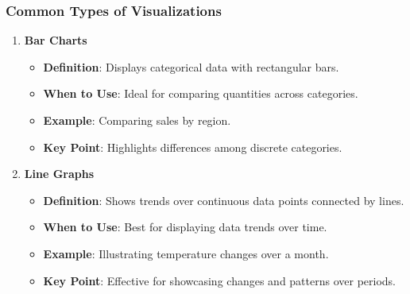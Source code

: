 \documentclass[aspectratio=169]{beamer}
\begin{document}
\begin{frame}[fragile]
    \frametitle{Common Types of Visualizations}
    \begin{enumerate}
        \item \textbf{Bar Charts}
            \begin{itemize}
                \item \textbf{Definition}: Displays categorical data with rectangular bars.
                \item \textbf{When to Use}: Ideal for comparing quantities across categories.
                \item \textbf{Example}: Comparing sales by region.
                \item \textbf{Key Point}: Highlights differences among discrete categories.
            \end{itemize}
        \item \textbf{Line Graphs}
            \begin{itemize}
                \item \textbf{Definition}: Shows trends over continuous data points connected by lines.
                \item \textbf{When to Use}: Best for displaying data trends over time.
                \item \textbf{Example}: Illustrating temperature changes over a month.
                \item \textbf{Key Point}: Effective for showcasing changes and patterns over periods.
            \end{itemize}
    \end{enumerate}
\end{frame}
\end{document}
